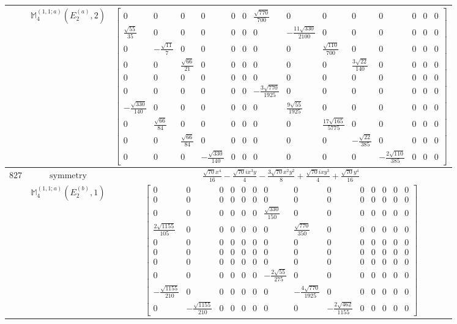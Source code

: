 \documentclass[fleqn,8pt,landscape]{jsarticle}
\begin{document}
\begin{longtable}{ccc}
$  $ & $ \mathbb{M}_{4}^{(1,1;a)}(E_{2}^{(a)},2) $ & $ \begin{bmatrix} 0 & 0 & 0 & 0 & 0 & 0 & \frac{\sqrt{770}}{700} & 0 & 0 & 0 & 0 & 0 & 0 & 0 \\ \frac{\sqrt{55}}{35} & 0 & 0 & 0 & 0 & 0 & 0 & - \frac{11 \sqrt{330}}{2100} & 0 & 0 & 0 & 0 & 0 & 0 \\ 0 & - \frac{\sqrt{11}}{7} & 0 & 0 & 0 & 0 & 0 & 0 & \frac{\sqrt{110}}{700} & 0 & 0 & 0 & 0 & 0 \\ 0 & 0 & \frac{\sqrt{66}}{21} & 0 & 0 & 0 & 0 & 0 & 0 & \frac{3 \sqrt{22}}{140} & 0 & 0 & 0 & 0 \\ 0 & 0 & 0 & 0 & 0 & 0 & 0 & 0 & 0 & 0 & 0 & 0 & 0 & 0 \\ 0 & 0 & 0 & 0 & 0 & 0 & - \frac{3 \sqrt{770}}{1925} & 0 & 0 & 0 & 0 & 0 & 0 & 0 \\ - \frac{\sqrt{330}}{140} & 0 & 0 & 0 & 0 & 0 & 0 & \frac{9 \sqrt{55}}{1925} & 0 & 0 & 0 & 0 & 0 & 0 \\ 0 & \frac{\sqrt{66}}{84} & 0 & 0 & 0 & 0 & 0 & 0 & \frac{17 \sqrt{165}}{5775} & 0 & 0 & 0 & 0 & 0 \\ 0 & 0 & \frac{\sqrt{66}}{84} & 0 & 0 & 0 & 0 & 0 & 0 & - \frac{\sqrt{22}}{385} & 0 & 0 & 0 & 0 \\ 0 & 0 & 0 & - \frac{\sqrt{330}}{140} & 0 & 0 & 0 & 0 & 0 & 0 & - \frac{2 \sqrt{110}}{385} & 0 & 0 & 0 \end{bmatrix} $ \\ \hline
$ 827 $ & $ \text{symmetry} $ & $ \frac{\sqrt{70} x^{4}}{16} - \frac{\sqrt{70} i x^{3} y}{4} - \frac{3 \sqrt{70} x^{2} y^{2}}{8} + \frac{\sqrt{70} i x y^{3}}{4} + \frac{\sqrt{70} y^{4}}{16} $ \\
$  $ & $ \mathbb{M}_{4}^{(1,1;a)}(E_{2}^{(b)},1) $ & $ \begin{bmatrix} 0 & 0 & 0 & 0 & 0 & 0 & 0 & 0 & 0 & 0 & 0 & 0 & 0 & 0 \\ 0 & 0 & 0 & 0 & 0 & 0 & 0 & 0 & 0 & 0 & 0 & 0 & 0 & 0 \\ 0 & 0 & 0 & 0 & 0 & 0 & \frac{\sqrt{330}}{150} & 0 & 0 & 0 & 0 & 0 & 0 & 0 \\ \frac{2 \sqrt{1155}}{105} & 0 & 0 & 0 & 0 & 0 & 0 & \frac{\sqrt{770}}{350} & 0 & 0 & 0 & 0 & 0 & 0 \\ 0 & 0 & 0 & 0 & 0 & 0 & 0 & 0 & 0 & 0 & 0 & 0 & 0 & 0 \\ 0 & 0 & 0 & 0 & 0 & 0 & 0 & 0 & 0 & 0 & 0 & 0 & 0 & 0 \\ 0 & 0 & 0 & 0 & 0 & 0 & 0 & 0 & 0 & 0 & 0 & 0 & 0 & 0 \\ 0 & 0 & 0 & 0 & 0 & 0 & - \frac{2 \sqrt{55}}{275} & 0 & 0 & 0 & 0 & 0 & 0 & 0 \\ - \frac{\sqrt{1155}}{210} & 0 & 0 & 0 & 0 & 0 & 0 & - \frac{4 \sqrt{770}}{1925} & 0 & 0 & 0 & 0 & 0 & 0 \\ 0 & - \frac{\sqrt{1155}}{210} & 0 & 0 & 0 & 0 & 0 & 0 & - \frac{2 \sqrt{462}}{1155} & 0 & 0 & 0 & 0 & 0 \end{bmatrix} $ \\ \hline

\end{longtable}
\end{document}
